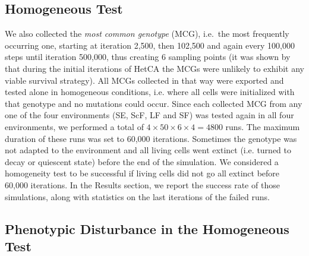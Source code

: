 \subsection{Homogeneous Test}

We also collected the \emph{most common genotype} (MCG), i.e.~the most frequently occurring one, starting at iteration 2,500, then 102,500 and again every 100,000 steps until iteration 500,000, thus creating 6 sampling points (it was shown by \citet{medernach2015evolutionary} that during the initial iterations of HetCA the MCGs were unlikely to exhibit any viable survival strategy). All MCGs collected in that way were exported and tested alone in homogeneous conditions, i.e. where all cells were initialized with that genotype and no mutations could occur. Since each collected MCG from any one of the four environments (SE, ScF, LF and SF) was tested again in all four environments, we performed a total of $4\times50\times6\times4=4800$ runs. The maximum duration of these runs was set to 60,000 iterations. Sometimes the genotype was not adapted to the environment and all living cells went extinct (i.e. turned to decay or quiescent state) before the end of the simulation. We considered a homogeneity test to be successful if living cells did not go all extinct before 60,000 iterations. In the Results section, we report the success rate of those simulations, along with statistics on the last iterations of the failed runs. 

\subsection{Phenotypic Disturbance in the Homogeneous Test} 

